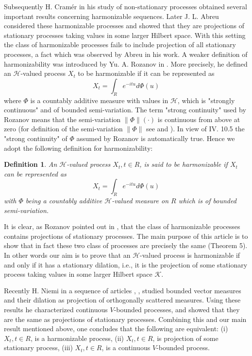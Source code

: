 \documentclass{article}
\newtheorem{definition}{Definition}
\begin{document}
Subsequently H. Cramér \cite{cramer} in his study of non-stationary processes obtained several important results concerning harmonizable sequences. Later J. L. Abreu \cite{abreu} considered these harmonizable processes and showed that they are projections of stationary processes taking values in some larger Hilbert space. With this setting the class of harmonizable processes fails to include projection of all stationary processes, a fact which was observed by Abreu in his work. A weaker definition of harmonizability was introduced by Yu. A. Rozanov in \cite{rozanov}. More precisely, he defined an $\mathscr{H}$-valued process $X_{t}$ to be harmonizable if it can be represented as
\begin{equation}
X_{t}=\int_{R} e^{-i t u} d \Phi(u)
\end{equation}
where $\Phi$ is a countably additive measure with values in $\mathscr{H}$, which is "strongly continuous" and of bounded semi-variation. The term "strong continuity" used by Rozanov means that the semi-variation $\|\Phi\|(\cdot)$ is continuous from above at zero (for definition of the semi-variation $\|\Phi\|$ see \cite{dunford} and \cite{rozanov}). In view of IV. 10.5 \cite{dunford} the "strong continuity" of $\Phi$ assumed by Rozanov is automatically true. Hence we adopt the following definition for harmonizability:

\begin{definition}
An $\mathscr{H}$-valued process $X_{t}, t \in R$, is said to be harmonizable if $X_{t}$ can be represented as
\begin{equation}
X_{t}=\int_{R} e^{-i t u} d \Phi(u)
\end{equation}
with $\Phi$ being a countably additive $\mathscr{H}$-valued measure on $R$ which is of bounded semi-variation.
\end{definition}

It is clear, as Rozanov pointed out in \cite{rozanov}, that the class of harmonizable processes contains projections of stationary processes. The main purpose of this article is to show that in fact these two class of processes are precisely the same (Theorem 5). In other words our aim is to prove that an $\mathscr{H}$-valued process is harmonizable if and only if it has a stationary dilation, i.e., it is the projection of some stationary process taking values in some larger Hilbert space $\mathscr{K}$.

Recently H. Niemi in a sequence of articles \cite{niemi1}, \cite{niemi2}, \cite{niemi3} studied bounded vector measures and their dilation as projection of orthogonally scattered measures. Using these results he characterized \cite{niemi4} continuous $V$-bounded processes, and showed that they are the same as projections of stationary processes. Combining this and our main result mentioned above, one concludes that the following are equivalent:
(i) $X_{t}, t \in R$, is a harmonizable process,
(ii) $X_{t}, t \in R$, is projection of some stationary process,
(iii) $X_{t}, t \in R$, is a continuous $V$-bounded process.
\end{document}
